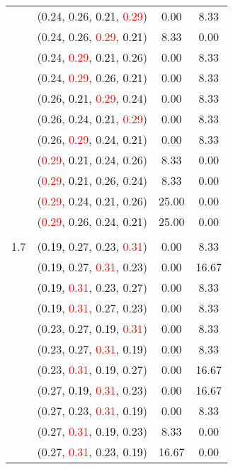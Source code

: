 \documentclass[10pt,a4paper]{report}
\begin{document}
\begin{center}
\begin{longtable}{clcc}
			&(0.24, 0.26, \textcolor{black}{0.21}, \textcolor{red}{0.29})&0.00&8.33\\
			&(0.24, 0.26, \textcolor{red}{0.29}, \textcolor{black}{0.21})&8.33&0.00\\
			&(0.24, \textcolor{red}{0.29}, \textcolor{black}{0.21}, 0.26)&0.00&8.33\\
			&(0.24, \textcolor{red}{0.29}, 0.26, \textcolor{black}{0.21})&0.00&8.33\\
			&(0.26, \textcolor{black}{0.21}, \textcolor{red}{0.29}, 0.24)&0.00&8.33\\
			&(0.26, 0.24, \textcolor{black}{0.21}, \textcolor{red}{0.29})&0.00&8.33\\
			&(0.26, \textcolor{red}{0.29}, 0.24, \textcolor{black}{0.21})&0.00&8.33\\
			&(\textcolor{red}{0.29}, \textcolor{black}{0.21}, 0.24, 0.26)&8.33&0.00\\
			&(\textcolor{red}{0.29}, \textcolor{black}{0.21}, 0.26, 0.24)&8.33&0.00\\
			&(\textcolor{red}{0.29}, 0.24, \textcolor{black}{0.21}, 0.26)&25.00&0.00\\
			&(\textcolor{red}{0.29}, 0.26, 0.24, \textcolor{black}{0.21})&25.00&0.00\\
		&&&\\
		1.7			&(\textcolor{black}{0.19}, 0.27, 0.23, \textcolor{red}{0.31})&0.00&8.33\\
			&(\textcolor{black}{0.19}, 0.27, \textcolor{red}{0.31}, 0.23)&0.00&16.67\\
			&(\textcolor{black}{0.19}, \textcolor{red}{0.31}, 0.23, 0.27)&0.00&8.33\\
			&(\textcolor{black}{0.19}, \textcolor{red}{0.31}, 0.27, 0.23)&0.00&8.33\\
			&(0.23, 0.27, \textcolor{black}{0.19}, \textcolor{red}{0.31})&0.00&8.33\\
			&(0.23, 0.27, \textcolor{red}{0.31}, \textcolor{black}{0.19})&0.00&8.33\\
			&(0.23, \textcolor{red}{0.31}, \textcolor{black}{0.19}, 0.27)&0.00&16.67\\
			&(0.27, \textcolor{black}{0.19}, \textcolor{red}{0.31}, 0.23)&0.00&16.67\\
			&(0.27, 0.23, \textcolor{red}{0.31}, \textcolor{black}{0.19})&0.00&8.33\\
			&(0.27, \textcolor{red}{0.31}, \textcolor{black}{0.19}, 0.23)&8.33&0.00\\
			&(0.27, \textcolor{red}{0.31}, 0.23, \textcolor{black}{0.19})&16.67&0.00\\

\end{longtable}
\end{center}
\end{document}
